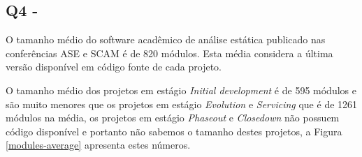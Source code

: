 %


%

\subsection{Q4 - \QuestaoQuatro} %

O tamanho médio do software acadêmico de análise estática publicado nas
conferências ASE e SCAM é de 820 módulos. Esta média considera a última versão
disponível em código fonte de cada projeto.


O tamanho médio dos projetos em estágio {\it Initial development} é de 595
módulos e são muito menores que os projetos em estágio {\it Evolution} e {\it
Servicing} que é de 1261 módulos na média, os projetos em estágio {\it
Phaseout} e {\it Closedown} não possuem código disponível e portanto não
sabemos o tamanho destes projetos, a Figura \ref{modules-average} apresenta
estes números.

